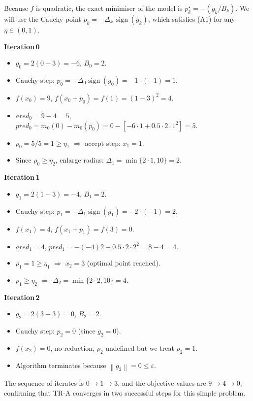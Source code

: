 \documentclass[11pt]{article}
\newcommand{\norm}[1]{\left\lVert#1\right\rVert}
\begin{document}
Because $f$ is quadratic, the exact minimiser of the model is $p_k^{\star}=-(g_k/B_k)$.  
We will use the Cauchy point $p_k=-\Delta_k\,\operatorname{sign}(g_k)$, which satisfies (A1) for any $\eta\in(0,1)$.

\medskip
\noindent\textbf{Iteration 0}
\begin{itemize}
\item $g_0=2(0-3)=-6$, $B_0=2$.
\item Cauchy step: $p_0=-\Delta_0\operatorname{sign}(g_0)= -1\cdot(-1)=1$.
\item $f(x_0)=9$, $f(x_0+p_0)=f(1)=(1-3)^2=4$.
\item $ared_0=9-4=5$, $pred_0=m_0(0)-m_0(p_0)=0-[-6\cdot1+0.5\cdot2\cdot1^2]=5$.
\item $\rho_0=5/5=1\ge\eta_1$ $\Rightarrow$ accept step: $x_1=1$.
\item Since $\rho_0\ge\eta_2$, enlarge radius: $\Delta_1=\min\{2\cdot1,10\}=2$.
\end{itemize}

\noindent\textbf{Iteration 1}
\begin{itemize}
\item $g_1=2(1-3)=-4$, $B_1=2$.
\item Cauchy step: $p_1=-\Delta_1\operatorname{sign}(g_1)=-2\cdot(-1)=2$.
\item $f(x_1)=4$, $f(x_1+p_1)=f(3)=0$.
\item $ared_1=4$, $pred_1= -(-4)2+0.5\cdot2\cdot2^2=8-4=4$.
\item $\rho_1=1\ge\eta_1$ $\Rightarrow$ $x_2=3$ (optimal point reached).
\item $\rho_1\ge\eta_2$ $\Rightarrow$ $\Delta_2=\min\{2\cdot2,10\}=4$.
\end{itemize}

\noindent\textbf{Iteration 2}
\begin{itemize}
\item $g_2=2(3-3)=0$, $B_2=2$.
\item Cauchy step: $p_2=0$ (since $g_2=0$).
\item $f(x_2)=0$, no reduction, $\rho_2$ undefined but we treat $\rho_2=1$.
\item Algorithm terminates because $\norm{g_2}=0\le\varepsilon$.
\end{itemize}

The sequence of iterates is $0\rightarrow 1\rightarrow 3$, and the objective values are $9\rightarrow4\rightarrow0$, confirming that TR‑A converges in two successful steps for this simple problem.
\end{document}
